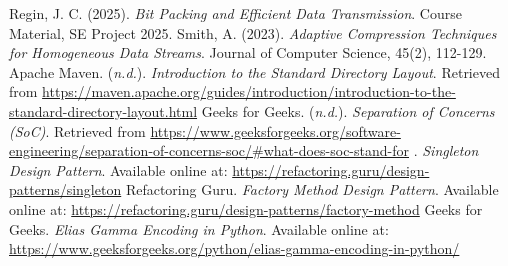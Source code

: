\documentclass[11pt, a4paper]{article}
\begin{document}
	\begin{thebibliography}{99}
		 Regin, J. C. (2025). \textit{Bit Packing and Efficient Data Transmission}. Course Material, SE Project 2025.
		 Smith, A. (2023). \textit{Adaptive Compression Techniques for Homogeneous Data Streams}. Journal of Computer Science, 45(2), 112-129.
		 Apache Maven. (\textit{n.d.}). \textit{Introduction to the Standard Directory Layout}. Retrieved from \url{https://maven.apache.org/guides/introduction/introduction-to-the-standard-directory-layout.html}
		 Geeks for Geeks. (\textit{n.d.}). \textit{Separation of Concerns (SoC)}. Retrieved from \url{https://www.geeksforgeeks.org/software-engineering/separation-of-concerns-soc/#what-does-soc-stand-for}
		. \textit{Singleton Design Pattern}. Available online at: \url{https://refactoring.guru/design-patterns/singleton} 
		Refactoring Guru. \textit{Factory Method Design Pattern}. Available online at: \url{https://refactoring.guru/design-patterns/factory-method}
		 Geeks for Geeks. \textit{Elias Gamma Encoding in Python}. Available online at: \url{https://www.geeksforgeeks.org/python/elias-gamma-encoding-in-python/}
	\end{thebibliography}
\end{document}
